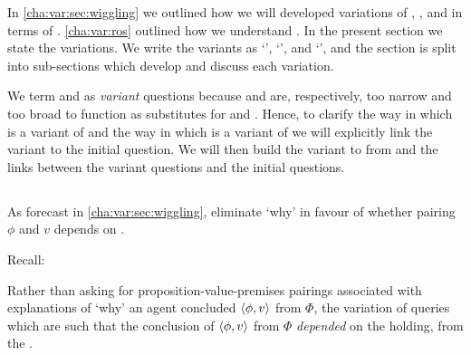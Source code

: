 \begin{note}
  In \autoref{cha:var:sec:wiggling} we outlined how we will developed variations of \qWhy{}, \qHow{}, and \issueInclusion{} in terms of \ros{}.
  \autoref{cha:var:ros} outlined how we understand .
  In the present section we state the variations.
  We write the variants as `\qWhyV{}', `\qHowV{}', and `\issueConstraint{}', and the section is split into sub-sections which develop and discuss each variation.


  We term \qWhyV{} and \qHowV{} as \emph{variant} questions because \qWhyV{} and \qHowV{} are, respectively, too narrow and too broad to function as substitutes for \qWhy{} and \qHow{}.
  Hence, to clarify the way in which \qWhyV{} is a variant of \qWhy{} and the way in which \qHowV{} is a variant of \qHow{} we will explicitly link the variant to the initial question.
  We will then build the variant to \issueInclusion{} from \issueInclusion{} and the links between the variant questions and the initial questions.
\end{note}

\subsection{\qWhyV{}}
\label{cha:var:sec:vars:qwhyvnp}

\begin{note}
  As forecast in \autoref{cha:var:sec:wiggling}, eliminate `why' in favour of whether pairing \(\phi\) and \(v\) depends on \ros{}.

  Recall:
  \begin{quote}%
    \vspace{-1.5\baselineskip}%
    \questionWhyBasic*
  \end{quote}

  Rather than asking for proposition-value-premises pairings associated with explanations of `why' an agent concluded \(\langle \phi, v \rangle\) from \(\Phi\), the variation of \qWhy{} queries which  are such that the conclusion of \(\langle \phi, v \rangle\) from \(\Phi\) \emph{depended} on the  holding, from the \agpe{}.
  \end{note}

